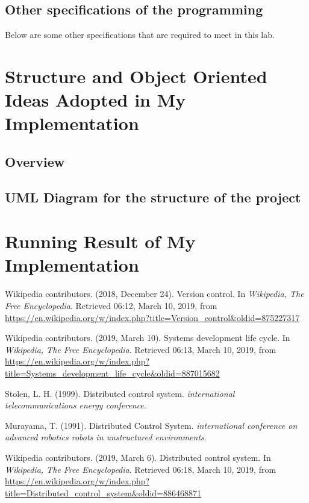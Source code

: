 \documentclass[a4paper]{report}
\begin{document}
\section{Other specifications of the programming}
Below are some other specifications that are required to meet in this lab.












\chapter{Structure and Object Oriented Ideas Adopted in My Implementation}
\section{Overview}



\section{UML Diagram for the structure of the project}








\chapter{Running Result of My Implementation}






\begin{thebibliography}{A}

Wikipedia contributors. (2018, December 24). Version control. In \emph{Wikipedia, The Free Encyclopedia}. Retrieved 06:12, March 10, 2019, from \url{https://en.wikipedia.org/w/index.php?title=Version_control&oldid=875227317}

Wikipedia contributors. (2019, March 10). Systems development life cycle. In \emph{Wikipedia, The Free Encyclopedia}. Retrieved 06:13, March 10, 2019, from \url{https://en.wikipedia.org/w/index.php?title=Systems_development_life_cycle&oldid=887015682}

Stolen, L. H. (1999). Distributed control system. \emph{international telecommunications energy conference.}

Murayama, T. (1991). Distributed Control System. \emph{international conference on advanced robotics robots in unstructured environments}.

Wikipedia contributors. (2019, March 6). Distributed control system. In \emph{Wikipedia, The Free Encyclopedia}. Retrieved 06:18, March 10, 2019, from \url{https://en.wikipedia.org/w/index.php?title=Distributed_control_system&oldid=886468871}

\end{thebibliography}
\end{document}
